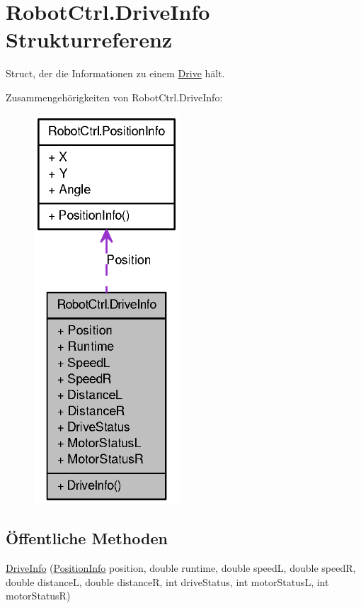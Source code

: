 \hypertarget{struct_robot_ctrl_1_1_drive_info}{
\section{RobotCtrl.DriveInfo Strukturreferenz}
\label{struct_robot_ctrl_1_1_drive_info}
}


Struct, der die Informationen zu einem \hyperlink{class_robot_ctrl_1_1_drive}{Drive} h\"{a}lt.  




Zusammengehörigkeiten von RobotCtrl.DriveInfo:\nopagebreak
\begin{figure}[H]
\begin{center}
\leavevmode
\includegraphics[width=154pt]{struct_robot_ctrl_1_1_drive_info__coll__graph}
\end{center}
\end{figure}
\subsection*{Öffentliche Methoden}
\begin{DoxyCompactItemize}
\item 
\hyperlink{struct_robot_ctrl_1_1_drive_info_a99d9fbb5a1b22a902112898282d68029}{DriveInfo} (\hyperlink{struct_robot_ctrl_1_1_position_info}{PositionInfo} position, double runtime, double speedL, double speedR, double distanceL, double distanceR, int driveStatus, int motorStatusL, int motorStatusR)
\end{DoxyCompactItemize}
